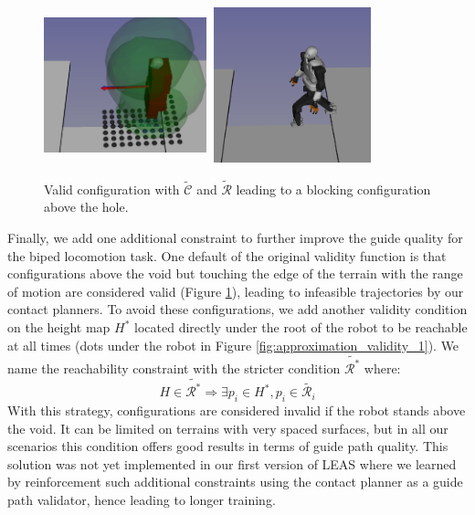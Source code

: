 \begin{figure}[ht]
    \centering
    \includegraphics[width=0.42\textwidth,height=4.5cm]{Figures/Chapter_LEAS/hole_scenario_above_void_p1.png}
    \includegraphics[width=0.42\textwidth,height=4.5cm]{Figures/Chapter_LEAS/hole_scenario_above_void.png}
    \caption{Valid configuration with $\tilde{\mathcal{C}}$ and $\tilde{\mathcal{R}}$ leading to a blocking configuration above the hole.}
    \label{fig:hole_scenario_above_void}
\end{figure}

Finally, we add one additional constraint to further improve the guide quality for the biped locomotion task. 
One default of the original validity function is that configurations above the void but touching the edge of the terrain with the range of motion are considered valid (Figure \ref{fig:hole_scenario_above_void}), leading to infeasible trajectories by our contact planners.
To avoid these configurations, we add another validity condition on the height map $H^*$ located directly under the root of the robot to be reachable at all times (dots under the robot in Figure \ref{fig:approximation_validity_1}). 
We name the reachability constraint with the stricter condition $\tilde{\mathcal{R}^*}$ where:
\begin{equation}
    H \in \tilde{\mathcal{R}^*} \Rightarrow \exists p_i \in H^*, p_i \in \tilde{\mathcal{R}_i}
\end{equation}
With this strategy, configurations are considered invalid if the robot stands above the void. 
It can be limited on terrains with very spaced surfaces, but in all our scenarios this condition offers good results in terms of guide path quality.
This solution was not yet implemented in our first version of LEAS \cite{LEAS} where we learned by reinforcement such additional constraints using the contact planner as a guide path validator, hence leading to longer training.

